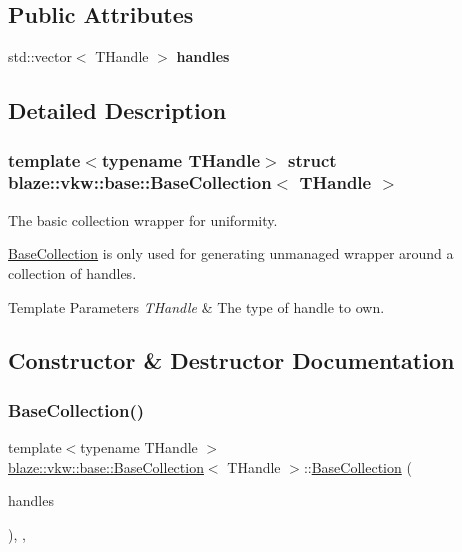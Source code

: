 \subsection*{Public Attributes}
\begin{DoxyCompactItemize}
\item 
\mbox{\label{structblaze_1_1vkw_1_1base_1_1BaseCollection_a1ad439023007af5c6e811d1ce98d5191}} 
std\+::vector$<$ T\+Handle $>$ {\bfseries handles}
\end{DoxyCompactItemize}


\subsection{Detailed Description}
\subsubsection*{template$<$typename T\+Handle$>$\newline
struct blaze\+::vkw\+::base\+::\+Base\+Collection$<$ T\+Handle $>$}

The basic collection wrapper for uniformity. 

\hyperlink{structblaze_1_1vkw_1_1base_1_1BaseCollection}{Base\+Collection} is only used for generating unmanaged wrapper around a collection of handles.


\begin{DoxyTemplParams}{Template Parameters}
{\em T\+Handle} & The type of handle to own. \\
\hline
\end{DoxyTemplParams}


\subsection{Constructor \& Destructor Documentation}
\mbox{\label{structblaze_1_1vkw_1_1base_1_1BaseCollection_a615d6c0aa6602f2f5678fed9e6ad1559}} 
\subsubsection{\texorpdfstring{Base\+Collection()}{BaseCollection()}}
{\footnotesize\ttfamily template$<$typename T\+Handle $>$ \\
\hyperlink{structblaze_1_1vkw_1_1base_1_1BaseCollection}{blaze\+::vkw\+::base\+::\+Base\+Collection}$<$ T\+Handle $>$\+::\hyperlink{structblaze_1_1vkw_1_1base_1_1BaseCollection}{Base\+Collection} (\begin{DoxyParamCaption}\item[{std\+::vector$<$ T\+Handle $>$ \&\&}]{handles }\end{DoxyParamCaption})\hspace{0.3cm}{\ttfamily [inline]}, {\ttfamily [explicit]}, {\ttfamily [noexcept]}}



